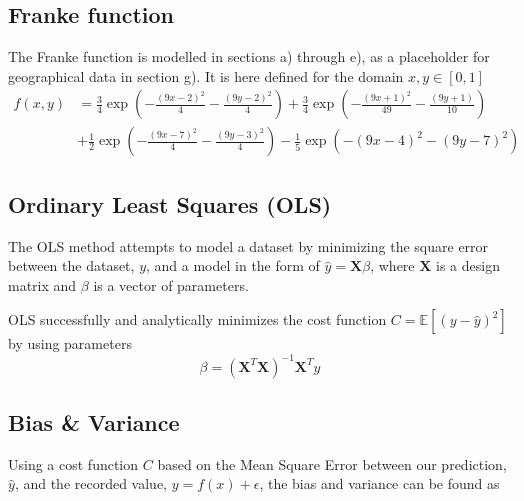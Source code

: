 \documentclass[a4paper, UKenglish]{article}
\newcommand{\0}{\mathbf{0}}
\newcommand{\1}{\mathbf{1}}
\begin{document}
\subsection{Franke function} \label{sec:Franke}
The Franke function is modelled in sections a) through e), as a placeholder for geographical data in section g). It is here defined for the domain $x,y \in [0,1]$
\begin{align*}
f(x,y) &= \frac{3}{4}\exp{\left(-\frac{(9x-2)^2}{4} - \frac{(9y-2)^2}{4}\right)}+\frac{3}{4}\exp{\left(-\frac{(9x+1)^2}{49}- \frac{(9y+1)}{10}\right)} \\
&+\frac{1}{2}\exp{\left(-\frac{(9x-7)^2}{4} - \frac{(9y-3)^2}{4}\right)} -\frac{1}{5}\exp{\left(-(9x-4)^2 - (9y-7)^2\right) }
\end{align*}

\subsection{Ordinary Least Squares (OLS)}
The OLS method attempts to model a dataset by minimizing the square error between the dataset, $y$, and a model in the form of $\hat{y} = \textbf{X} \beta$, where $\textbf{X}$ is a design matrix and $\beta$ is a vector of parameters.

OLS successfully and analytically minimizes the cost function $C = \mathbb{E}[(y - \hat{y})^2]$ by using parameters $$\beta = \left(\textbf{X}^T\textbf{X}\right)^{-1} \textbf{X}^T y $$

\subsection{Bias \& Variance}
Using a cost function $C$ based on the Mean Square Error between our prediction, $\hat{y}$, and the recorded value, $y = f(x) + \epsilon$, the bias and variance can be found as
\end{document}
